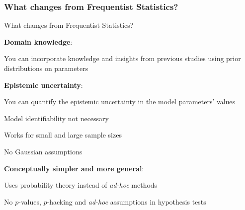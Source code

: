 \subsubsection{What changes from Frequentist Statistics?}
\begin{frame}{What changes from Frequentist Statistics?}
	\begin{vfilleditems}
		\item \textbf{Domain knowledge}:
		\begin{vfilleditems}
			\item You can incorporate knowledge and insights from previous studies using prior distributions on parameters
		\end{vfilleditems}
		\item \textbf{Epistemic uncertainty}:
		\begin{vfilleditems}
			\item You can quantify the epistemic uncertainty in the model parameters' values
			\item Model identifiability not necessary
			\item Works for small and large sample sizes
			\item No Gaussian assumptions
		\end{vfilleditems}
		\item \textbf{Conceptually simpler and more general}:
		\begin{vfilleditems}
			\item Uses probability theory instead of \textit{ad-hoc} methods
			\item No $p$-values, $p$-hacking and \textit{ad-hoc} assumptions in hypothesis tests
		\end{vfilleditems}
	\end{vfilleditems}
\end{frame}

